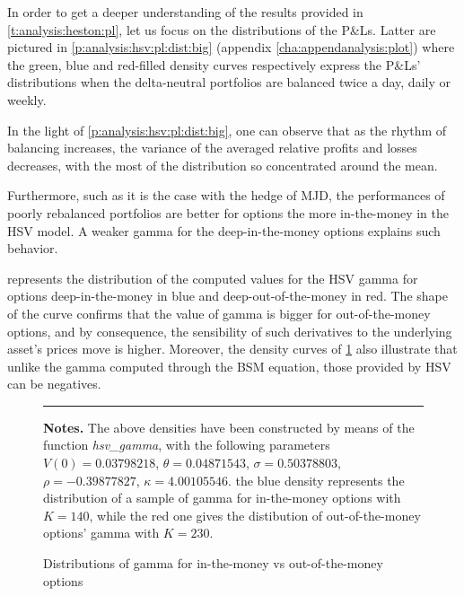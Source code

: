 \documentclass[12pt]{report}
\begin{document}
In order to get a deeper understanding of the results provided in \cref{t:analysis:heston:pl}, let us focus on the distributions of the P\&Ls. 
Latter are pictured in \cref{p:analysis:hsv:pl:dist:big} (appendix \cref{cha:appendanalysis:plot}) where the green, blue and red-filled density curves respectively express the P\&Ls' distributions when the delta-neutral portfolios are balanced twice a day, daily or weekly.




         

In the light of \cref{p:analysis:hsv:pl:dist:big}, one can observe that as the rhythm of balancing increases, the variance of the averaged relative profits and losses decreases, with the most of the distribution so concentrated around the mean.



Furthermore, such as it is the case with the hedge of MJD, the performances of poorly rebalanced portfolios are better for options the more in-the-money in the HSV model. 
A weaker gamma for the deep-in-the-money options explains such behavior.

 represents the distribution of the computed values for the HSV gamma for options deep-in-the-money in blue and deep-out-of-the-money in red.
The shape of the curve confirms that the value of gamma is bigger for out-of-the-money options, and by consequence, the sensibility of such derivatives to the underlying asset's prices move is higher.
Moreover, the density curves of \cref{p:analysis:hsv:gamma} also illustrate that unlike the gamma computed through the BSM equation, those provided by HSV can be negatives.




\begin{figure}[h]
  \centering
  \rule{40mm}{20mm}
  \caption{Distributions of gamma for in-the-money vs out-of-the-money options}
  \begin{changemargin}{0.5cm}{0.5cm}
  \medskip
\footnotesize
{}\textbf{Notes.} The above densities have been constructed by means of the function \textit{hsv\_gamma}, with the following parameters $V(0) = 0.03798218$, $\theta = 0.04871543$, $\sigma = 0.50378803$, $\rho = -0.39877827$, $\kappa = 4.00105546$. the blue density represents the distribution of a sample of gamma for in-the-money options with $K = 140$, while the red one gives the distibution of out-of-the-money options' gamma with $K = 230$.
  \end{changemargin}
  \label{p:analysis:hsv:gamma}
\end{figure}
\end{document}
